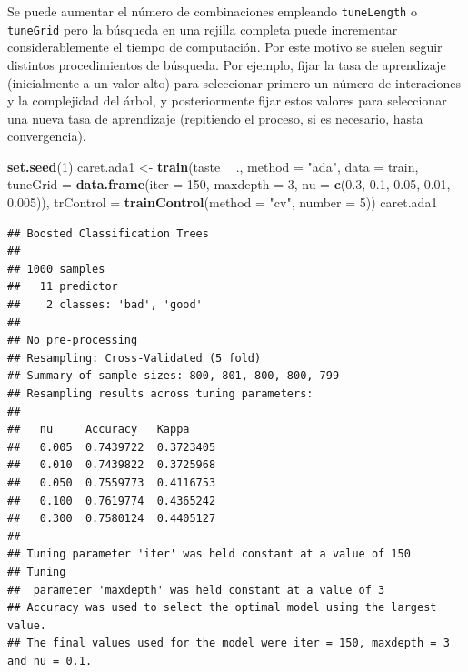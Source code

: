 \documentclass[
]{book}
\newenvironment{Shaded}{\begin{snugshade}}{\end{snugshade}}
\newcommand{\DataTypeTok}[1]{\textcolor[rgb]{0.13,0.29,0.53}{#1}}
\newcommand{\DecValTok}[1]{\textcolor[rgb]{0.00,0.00,0.81}{#1}}
\newcommand{\FloatTok}[1]{\textcolor[rgb]{0.00,0.00,0.81}{#1}}
\newcommand{\KeywordTok}[1]{\textcolor[rgb]{0.13,0.29,0.53}{\textbf{#1}}}
\newcommand{\NormalTok}[1]{#1}
\newcommand{\OperatorTok}[1]{\textcolor[rgb]{0.81,0.36,0.00}{\textbf{#1}}}
\newcommand{\StringTok}[1]{\textcolor[rgb]{0.31,0.60,0.02}{#1}}
\theoremstyle{break}
\theoremstyle{definition}
\theoremstyle{definition}
\theoremstyle{definition}
\theoremstyle{remark}
\begin{document}
Se puede aumentar el número de combinaciones empleando \texttt{tuneLength} o \texttt{tuneGrid} pero la búsqueda en una rejilla completa puede incrementar considerablemente el tiempo de computación.
Por este motivo se suelen seguir distintos procedimientos de búsqueda. Por ejemplo, fijar la tasa de aprendizaje (inicialmente a un valor alto) para seleccionar primero un número de interaciones y la complejidad del árbol, y posteriormente fijar estos valores para seleccionar una nueva tasa de aprendizaje (repitiendo el proceso, si es necesario, hasta convergencia).

\begin{Shaded}
\begin{Highlighting}[]
\KeywordTok{set.seed}\NormalTok{(}\DecValTok{1}\NormalTok{)}
\NormalTok{caret.ada1 <-}\StringTok{ }\KeywordTok{train}\NormalTok{(taste }\OperatorTok{~}\StringTok{ }\NormalTok{., }\DataTypeTok{method =} \StringTok{"ada"}\NormalTok{, }\DataTypeTok{data =}\NormalTok{ train,}
                    \DataTypeTok{tuneGrid =} \KeywordTok{data.frame}\NormalTok{(}\DataTypeTok{iter =}  \DecValTok{150}\NormalTok{, }\DataTypeTok{maxdepth =} \DecValTok{3}\NormalTok{,}
                                 \DataTypeTok{nu =} \KeywordTok{c}\NormalTok{(}\FloatTok{0.3}\NormalTok{, }\FloatTok{0.1}\NormalTok{, }\FloatTok{0.05}\NormalTok{, }\FloatTok{0.01}\NormalTok{, }\FloatTok{0.005}\NormalTok{)),}
                   \DataTypeTok{trControl =} \KeywordTok{trainControl}\NormalTok{(}\DataTypeTok{method =} \StringTok{"cv"}\NormalTok{, }\DataTypeTok{number =} \DecValTok{5}\NormalTok{))}
\NormalTok{caret.ada1}
\end{Highlighting}
\end{Shaded}

\begin{verbatim}
## Boosted Classification Trees 
## 
## 1000 samples
##   11 predictor
##    2 classes: 'bad', 'good' 
## 
## No pre-processing
## Resampling: Cross-Validated (5 fold) 
## Summary of sample sizes: 800, 801, 800, 800, 799 
## Resampling results across tuning parameters:
## 
##   nu     Accuracy   Kappa    
##   0.005  0.7439722  0.3723405
##   0.010  0.7439822  0.3725968
##   0.050  0.7559773  0.4116753
##   0.100  0.7619774  0.4365242
##   0.300  0.7580124  0.4405127
## 
## Tuning parameter 'iter' was held constant at a value of 150
## Tuning
##  parameter 'maxdepth' was held constant at a value of 3
## Accuracy was used to select the optimal model using the largest value.
## The final values used for the model were iter = 150, maxdepth = 3 and nu = 0.1.
\end{verbatim}
\end{document}
